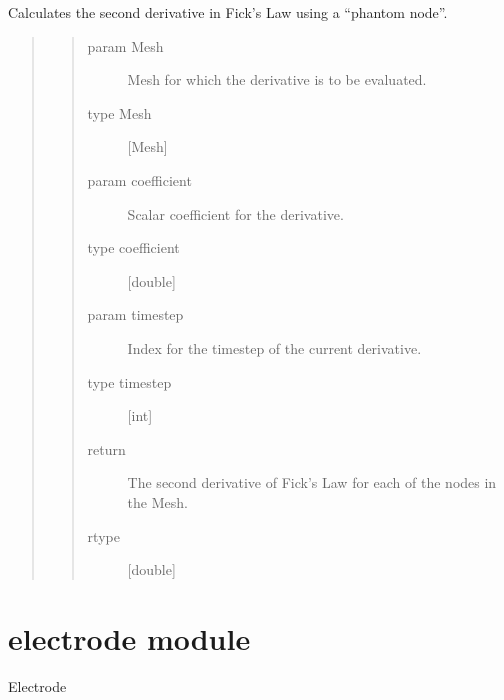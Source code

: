 \documentclass[letterpaper,10pt,english]{sphinxmanual}
\begin{document}
\begin{fulllineitems}
\label{\detokenize{derivative:derivative.second_derivative}}
\sphinxAtStartPar
Calculates the second derivative in Fick’s Law using a “phantom node”.
\begin{quote}
\begin{quote}\begin{description}
\item[{param Mesh}] \leavevmode
\sphinxAtStartPar
Mesh for which the derivative is to be evaluated.

\item[{type Mesh}] \leavevmode
\sphinxAtStartPar
{[}Mesh{]}

\item[{param coefficient}] \leavevmode
\sphinxAtStartPar
Scalar coefficient for the derivative.

\item[{type coefficient}] \leavevmode
\sphinxAtStartPar
{[}double{]}

\item[{param timestep}] \leavevmode
\sphinxAtStartPar
Index for the timestep of the current derivative.

\item[{type timestep}] \leavevmode
\sphinxAtStartPar
{[}int{]}

\item[{return}] \leavevmode
\sphinxAtStartPar
The second derivative of Fick’s Law for each of the nodes in the Mesh.

\item[{rtype}] \leavevmode
\sphinxAtStartPar
{[}double{]}

\end{description}\end{quote}
\end{quote}

\end{fulllineitems}



\section{electrode module}
\label{\detokenize{electrode:module-electrode}}\label{\detokenize{electrode:electrode-module}}\label{\detokenize{electrode::doc}}
\sphinxAtStartPar
Electrode
\end{document}
